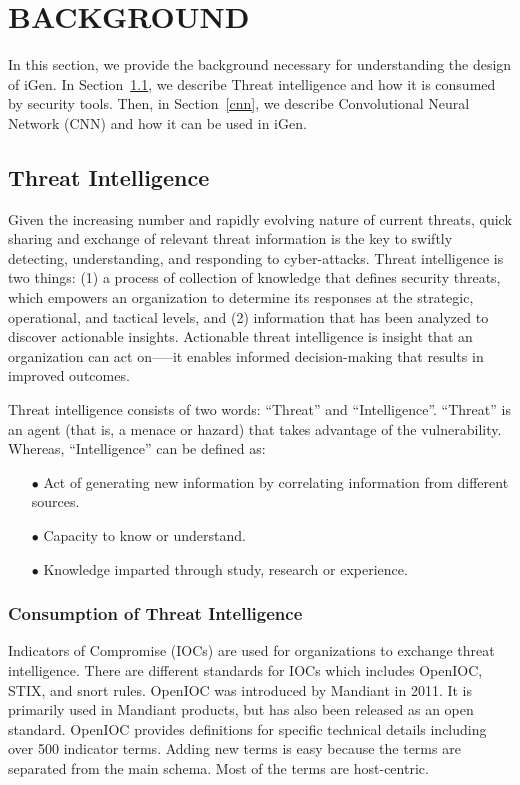 \chapter{BACKGROUND} \label{chap:background}
In this section, we provide the background necessary for understanding the design of iGen. In Section~\ref{ti}, we describe Threat intelligence and how it is consumed by security tools. Then, in Section~\ref{cnn}, we describe Convolutional Neural Network (CNN) and how it can be used in iGen.  

\section{Threat Intelligence} \label{ti}

Given the increasing number and rapidly evolving nature of current threats, quick sharing and exchange of relevant threat information is the key to swiftly detecting, understanding, and responding to cyber-attacks. Threat intelligence is two things: (1) a process of collection of knowledge that defines security threats, which empowers an organization to determine its responses at the strategic, operational, and tactical levels, and (2) information that has been analyzed to discover actionable insights. Actionable threat intelligence is insight that an organization can act on—--it enables informed decision-making that results in improved outcomes. 

Threat intelligence consists of two words: ``Threat'' and ``Intelligence''. ``Threat'' is an agent (that is, a menace or hazard) that takes advantage of the vulnerability. Whereas, ``Intelligence'' can be defined as: 
\begin{itemize}
 \item[$\bullet$ ] Act of generating new information by correlating information from different sources.
  \item[$\bullet$ ] Capacity to know or understand.
  \item[$\bullet$ ] Knowledge imparted through study, research or experience.
\end{itemize}


\subsection{Consumption of Threat Intelligence}

Indicators of Compromise (IOCs) are used for organizations to exchange threat intelligence. There are different standards for IOCs which includes OpenIOC, STIX, and snort rules. OpenIOC was introduced by Mandiant in 2011.  It is primarily used in Mandiant products, but has also been released as an open standard. OpenIOC provides definitions for specific technical details including over 500 indicator terms. Adding new terms is easy because the terms are separated from the main schema. Most of the terms are host-centric.

